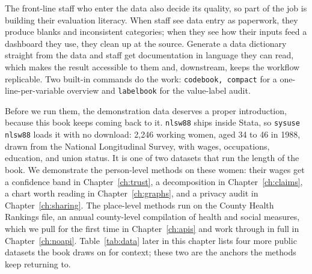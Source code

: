 The front-line staff who enter the data also decide its quality, so part of the job is building their evaluation literacy. When staff see data entry as paperwork, they produce blanks and inconsistent categories; when they see how their inputs feed a dashboard they use, they clean up at the source. Generate a data dictionary straight from the data and staff get documentation in language they can read, which makes the result accessible to them and, downstream, keeps the workflow replicable. Two built-in commands do the work: \texttt{codebook, compact} for a one-line-per-variable overview and \texttt{labelbook} for the value-label audit.

Before we run them, the demonstration data deserves a proper introduction, because this book keeps coming back to it. \texttt{nlsw88} ships inside Stata, so \texttt{sysuse nlsw88} loads it with no download: 2{,}246 working women, aged 34 to 46 in 1988, drawn from the National Longitudinal Survey, with wages, occupations, education, and union status. It is one of two datasets that run the length of the book. We demonstrate the person-level methods on these women: their wages get a confidence band in Chapter~\ref{ch:trust}, a decomposition in Chapter~\ref{ch:claims}, a chart worth reading in Chapter~\ref{ch:graphs}, and a privacy audit in Chapter~\ref{ch:sharing}. The place-level methods run on the County Health Rankings file, an annual county-level compilation of health and social measures, which we pull for the first time in Chapter~\ref{ch:apis} and work through in full in Chapter~\ref{ch:noapi}. Table~\ref{tab:data} later in this chapter lists four more public datasets the book draws on for context; these two are the anchors the methods keep returning to.

